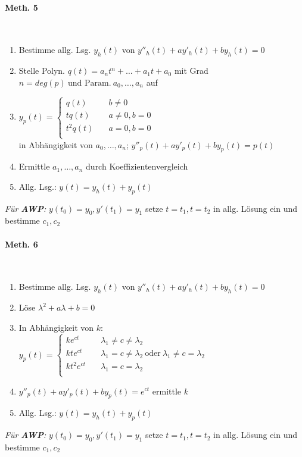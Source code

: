 \documentclass[paper=a3,paper=landscape, fontsize=9pt, DIV=30]{scrartcl}
\begin{document}
\begin{multicols*}{4}
  \paragraph{Meth. 5}\hspace{0pt}\\
  \begin{enumerate}
  	\item Bestimme allg. Lsg. $y_h(t)$ von $y''_h(t)+ay'_h(t)+by_h(t)=0$
  	\item Stelle Polyn. $q(t)=a_nt^n+\dots+a_1t+a_0$ mit Grad $n=deg(p) \ \text{und Param.}\ a_0,\dots,a_n$ auf
  	\item $y_p(t) =
  	\begin{cases}
  		q(t)    & \quad b \neq 0 \\
  		tq(t)   & \quad a \neq 0, b = 0\\
  		t^2q(t) & \quad a = 0, b = 0\\
  	\end{cases}
  	$\\
  in Abhängigkeit von $a_0,\dots ,a_n$;
  $y''_p(t)+ay'_p(t)+by_p(t)=p(t)$
 \item Ermittle $a_1,\dots,a_n$ durch Koeffizientenvergleich
 \item Allg. Lsg.: $y(t)=y_h(t)+y_p(t)$
  \end{enumerate}
  \textit{Für \textbf{AWP}:} $y(t_0)=y_0, y'(t_1)=y_1$ setze $t=t_1, t=t_2$ in allg. Lösung ein und bestimme $c_1,c_2$

    \paragraph{Meth. 6}\hspace{0pt}\\
    \begin{enumerate}
    	\item Bestimme allg. Lsg. $y_h(t)$ von $y''_h(t)+ay'_h(t)+by_h(t)=0$
    \item Löse $\lambda^2+a\lambda+b=0$
    \item In Abhängigkeit von $k$:\\$y_p(t) =
    \begin{cases}
    ke^{ct}    & \quad \lambda_1 \neq c \neq \lambda_2 \\
    kte^{ct}   & \quad \lambda_1 = c \neq \lambda_2 \ \text{oder}\ \lambda_1 \neq c = \lambda_2 \\
    kt^2e^{ct} & \quad  \lambda_1 = c = \lambda_2 \\
    \end{cases}
    $
    \item $y''_p(t)+ay'_p(t)+by_p(t)=e^{ct}$
    ermittle $k$
    \item Allg. Lsg.: $y(t)=y_h(t)+y_p(t)$
    \end{enumerate}
	\textit{Für \textbf{AWP}:} $y(t_0)=y_0, y'(t_1)=y_1$ setze $t=t_1, t=t_2$ in allg. Lösung ein und bestimme $c_1,c_2$


\end{multicols*}
\end{document}
